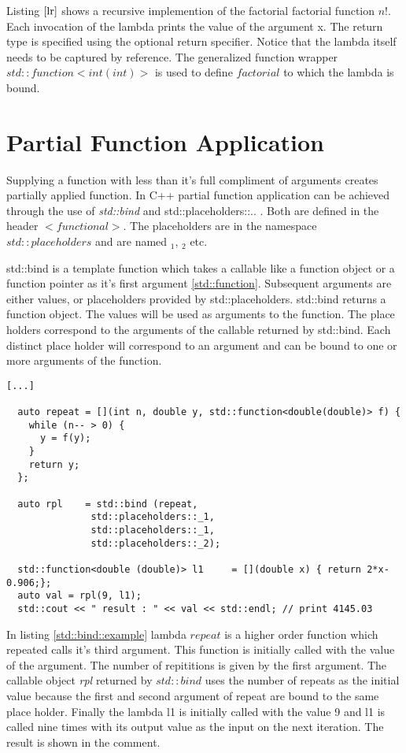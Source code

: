 \documentclass[12pt,fleqn]{article}
\begin{document}
Listing $\ref{lr}$ shows a recursive implemention of the factorial factorial function $n!$. 
Each invocation of the lambda prints the value of the argument x.
The return type is specified using the optional return specifier.
Notice that the lambda itself needs to be captured by reference.
The generalized function wrapper $std::function<int(int)>$ is used to define $factorial$ to which the lambda is bound. 
\section*{Partial Function Application}
Supplying a function with less than it's full compliment of arguments creates partially applied function.
In C++ partial function application can be achieved through the use of {\em std::bind} \cite{std::bind} and {std::placeholders::..} \cite{std::placeholder}.
Both are defined in the header $<functional>$. The placeholders are in the namespace $std::placeholders$ and are named $_1$, $_2$ etc.

std::bind is a template function which takes a callable like a function object or a function pointer as it's first argument \ref{std::function}.
Subsequent arguments are either values, or placeholders provided by std::placeholders. 
std::bind returns a function object.
The values will be used as arguments to the function.
The place holders correspond to the arguments of the callable returned by std::bind.
Each distinct place holder will correspond to an argument and can be bound to one or more arguments of the function.

\begin{lstlisting}[caption=std::bind example, label=std::bind::example]
[...]
 
  auto repeat = [](int n, double y, std::function<double(double)> f) { 
    while (n-- > 0) {
      y = f(y);
    }
    return y;
  };

  auto rpl    = std::bind (repeat,
			   std::placeholders::_1,
			   std::placeholders::_1,
			   std::placeholders::_2);

  std::function<double (double)> l1     = [](double x) { return 2*x-0.906;};
  auto val = rpl(9, l1);
  std::cout << " result : " << val << std::endl; // print 4145.03

\end{lstlisting}
In listing \ref{std::bind::example} lambda $repeat$ is a higher order function which repeated calls it's third argument. 
This function is initially called with the value of the  argument.
The number of repititions is given by the first argument. 
The callable object {\em rpl} returned by $std::bind$ uses the number of repeats as the initial value because the first and second argument of repeat are bound to the same place holder. 
Finally the lambda l1 is initially called with the value 9 and l1 is called nine times with its output value as the input on the next iteration. 
The result is shown in the comment.
\end{document}
